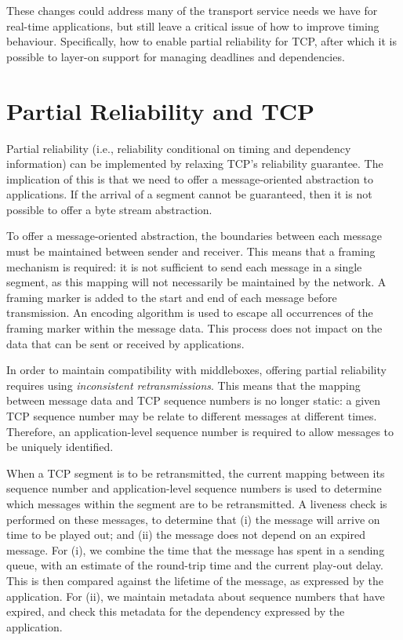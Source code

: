 \documentclass[10pt]{sig-alternate-05-2015}
\begin{document}
These changes could address many of the transport service needs we have for
real-time applications, but still leave a critical issue of how to improve
timing behaviour. Specifically, how to enable partial reliability for TCP,
after which it is possible to layer-on support for managing deadlines and
dependencies.

\section{Partial Reliability and TCP}
\label{sec:partial}

Partial reliability (i.e., reliability conditional on timing and dependency
information) can be implemented by relaxing TCP's reliability guarantee.
The implication of this is that we need to offer a message-oriented
abstraction to applications. If the arrival of a segment cannot be
guaranteed, then it is not possible to offer a byte stream abstraction.

To offer a message-oriented abstraction, the boundaries between each
message must be maintained between sender and receiver. This means that a
framing mechanism is required: it is not sufficient to send each message in
a single segment, as this mapping will not necessarily be maintained by the
network. A framing marker is added to the start and end of each message
before transmission. An encoding algorithm is used to escape all occurrences
of the framing marker within the message data. This process does not impact
on the data that can be sent or received by applications.

In order to maintain compatibility with middleboxes, offering partial
reliability requires using \emph{inconsistent retransmissions}. This means
that the mapping between message data and TCP sequence numbers is no longer
static: a given TCP sequence number may be relate to different messages at
different times. Therefore, an application-level sequence number is
required to allow messages to be uniquely identified.

When a TCP segment is to be retransmitted, the current mapping between its
sequence number and application-level sequence numbers is used to determine
which messages within the segment are to be retransmitted. A liveness check
is performed on these messages, to determine that (i) the message will
arrive on time to be played out; and (ii) the message does not depend on an
expired message. For (i), we combine the time that the message has spent in
a sending queue, with an estimate of the round-trip time and the current
play-out delay. This is then compared against the lifetime of the message,
as expressed by the application. For (ii), we maintain metadata about
sequence numbers that have expired, and check this metadata for the
dependency expressed by the application.
\end{document}

